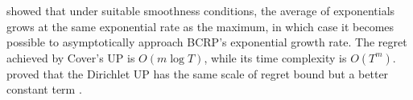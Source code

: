 \citet{cover} showed that under suitable smoothness conditions, the average of exponentials grows at the same exponential rate as the maximum, in which case it becomes possible to asymptotically approach BCRP's exponential growth rate. The regret achieved by Cover's UP is $O(m\log T)$, while its time complexity is $O(T^m)$. \citet{cover96} proved that the Dirichlet UP has the same scale of regret bound but a better constant term \citep[Theorem~2]{cover96}.
%
%
%
%
%
%
%
%
%
%
%
%
%
%
%
%
%
%
%
%
%
